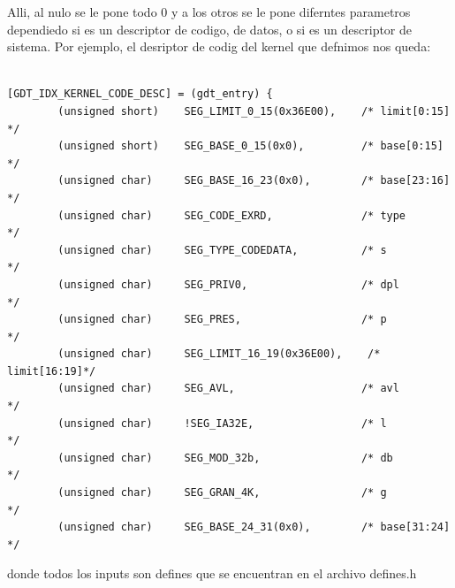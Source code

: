 \documentclass[a4paper]{article}
\newenvironment{codesnippet}{%
	\begin{Sbox}\begin{minipage}{\textwidth}\sffamily\small}%
	{\end{minipage}\end{Sbox}%
		\begin{center}%
		\vspace{-0.4cm}\colorbox{litegrey}{\TheSbox}\end{center}\vspace{0.3cm}}
\begin{document}
Alli, al nulo se le pone todo 0 y a los otros se le pone diferntes parametros dependiedo si es un descriptor de codigo, de datos, o si es un descriptor de sistema. Por ejemplo, el desriptor de codig del kernel que defnimos nos queda:

\begin{codesnippet}
\begin{verbatim}

[GDT_IDX_KERNEL_CODE_DESC] = (gdt_entry) {
        (unsigned short)    SEG_LIMIT_0_15(0x36E00),    /* limit[0:15]  */
        (unsigned short)    SEG_BASE_0_15(0x0),         /* base[0:15]   */
        (unsigned char)     SEG_BASE_16_23(0x0),        /* base[23:16]  */
        (unsigned char)     SEG_CODE_EXRD,              /* type         */ 
        (unsigned char)     SEG_TYPE_CODEDATA,          /* s            */
        (unsigned char)     SEG_PRIV0,                  /* dpl          */
        (unsigned char)     SEG_PRES,                   /* p            */
        (unsigned char)     SEG_LIMIT_16_19(0x36E00),    /* limit[16:19]*/
        (unsigned char)     SEG_AVL,                    /* avl          */
        (unsigned char)     !SEG_IA32E,                 /* l            */
        (unsigned char)     SEG_MOD_32b,                /* db           */
        (unsigned char)     SEG_GRAN_4K,                /* g            */
        (unsigned char)     SEG_BASE_24_31(0x0),        /* base[31:24]  */

\end{verbatim}
\end{codesnippet}

donde todos los inputs son defines que se encuentran en el archivo defines.h
\end{document}
